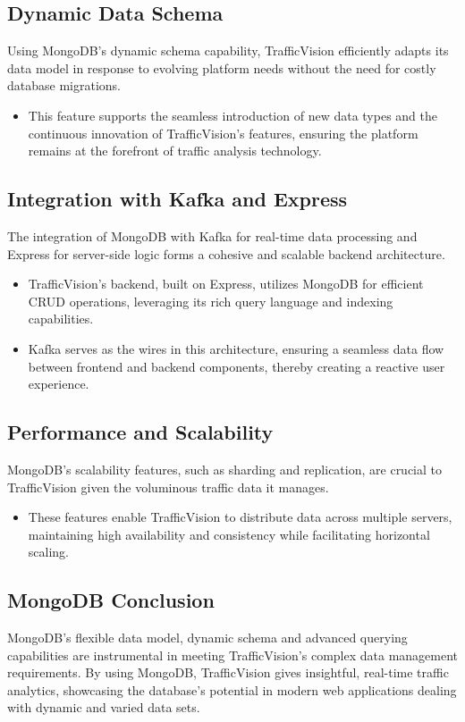 \subsection{Dynamic Data Schema}
Using MongoDB's dynamic schema capability, TrafficVision efficiently adapts its data model in response to evolving platform needs without the need for costly database migrations.
\begin{itemize}
    \item This feature supports the seamless introduction of new data types and the continuous innovation of TrafficVision's features, ensuring the platform remains at the forefront of traffic analysis technology.
\end{itemize}

\subsection{Integration with Kafka and Express}
The integration of MongoDB with Kafka for real-time data processing and Express for server-side logic forms a cohesive and scalable backend architecture.
\begin{itemize}
    \item TrafficVision's backend, built on Express, utilizes MongoDB for efficient CRUD operations, leveraging its rich query language and indexing capabilities.
    \item Kafka serves as the wires in this architecture, ensuring a seamless data flow between frontend and backend components, thereby creating a reactive user experience.
\end{itemize}

\subsection{Performance and Scalability}
MongoDB's scalability features, such as sharding and replication, are crucial to TrafficVision given the voluminous traffic data it manages.
\begin{itemize}
    \item These features enable TrafficVision to distribute data across multiple servers, maintaining high availability and consistency while facilitating horizontal scaling.
\end{itemize}

\subsection{MongoDB Conclusion}
MongoDB's flexible data model, dynamic schema and advanced querying capabilities are instrumental in meeting TrafficVision's complex data management requirements. By using MongoDB, TrafficVision gives insightful, real-time traffic analytics, showcasing the database's potential in modern web applications dealing with dynamic and varied data sets.

